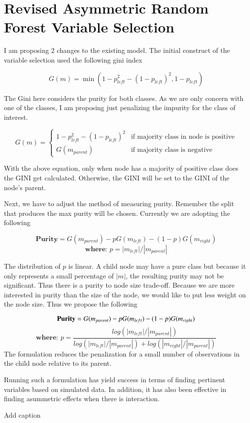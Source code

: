 \documentclass[12pt]{report}
\begin{document}
\section{Revised Asymmetric Random Forest Variable Selection}
I am proposing 2 changes to the existing model. The initial construct of the variable selection used the following gini index

\begin{equation}\label{eqn:asymmetricginiindex}
	G(m)=\min(1-p_{left}^2-(1-p_{left})^2, 1-p_{left})
\end{equation}

The Gini here considers the purity for both classes. As we are only concern with one of the classes, I am proposing just penalizing the impurity for the class of interest. 


\begin{equation}\label{Eq:asymmetricginiindex2}
G(m)=
\begin{cases} 1-p_{left}^2-(1-p_{left})^2 & \text{if majority class in node is positive}
\\ G(m_{parent})&\text{if majority class is negative}
\end{cases}
\end{equation}

With the above equation, only when node has a majority of positive class does the GINI get calculated. Otherwise, the GINI will be set to the GINI of the node's parent.

Next, we have to adjust the method of measuring purity. Remember the split that produces the max purity will be chosen. Currently we are adopting the following

\[
	\textbf{Purity}=G(m_{parent})-pG(m_{left})-(1-p)G(m_{right})
\]
\[
	\textbf{where: } p = |m_{left}|/|m_{parent}|
\]

The distribution of $p$ is linear. A child node may have a pure class but because it only represents a small percentage of $|m|$, the resulting purity may not be significant. Thus there is a purity to node size trade-off. Because we are more interested in purity than the size of the node, we would like to put less weight on the node size. Thus we propose the following

\[
	\textbf{Purity}=G(m_{parent})-pG(m_{left})-(1-p)G(m_{right})\\
\]
\[
\textbf{where: } p = \frac{log(|m_{left}|/|m_{parent}|)}{log(|m_{left}|/|m_{parent}|) +log(|m_{right}|/|m_{parent}|)}
\]
The formulation reduces the penalization for a small number of observations in the child node relative to its parent.

Running such a formulation has yield success in terms of finding pertinent variables based on simulated data. In addition, it has also been effective in finding asummetric effects when there is interaction.

\begin{table}[htbp]\label{table:HeartDisease1}
  \centering
  \caption{Add caption}
 
  \label{tab:addlabel}%
\end{table}%
\end{document}

